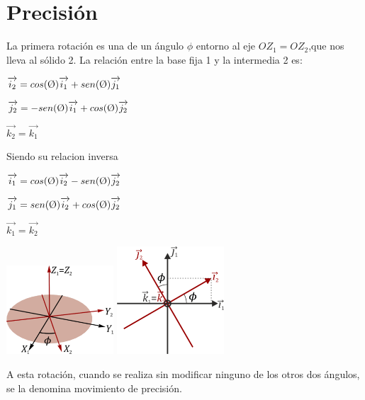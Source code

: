 \documentclass[12pt,a4paper]{report}
\begin{document}
\section{Precisión}
La primera rotación es una de un ángulo $\phi$ entorno al eje $OZ_{1}=OZ_{2}$,que nos lleva al sólido 2. La relación entre la base fija 1 y la intermedia 2 es:
\begin{center}
 $\overrightarrow{i_{2}}=cos(\textrm \O)\overrightarrow{i_{1}}+sen(\textrm \O)\overrightarrow{j_{1}}$ 
 
 $\overrightarrow{j_{2}}=-sen(\textrm \O)\overrightarrow{i_{1}}+cos(\textrm \O)\overrightarrow{j_{2}}$
 
 $\overrightarrow{k_{2}}=\overrightarrow{k_{1}}$
 \end{center} 
Siendo su relacion inversa
\begin{center}
$\overrightarrow{i_{1}}=cos(\textrm \O)\overrightarrow{i_{2}}-sen(\textrm \O)\overrightarrow{j_{2}}$

$\overrightarrow{j_{1}}=sen(\textrm \O)\overrightarrow{i_{2}}+cos(\textrm \O)\overrightarrow{j_{2}}$

$\overrightarrow{k_{1}}=\overrightarrow{k_{2}}$
\end{center}
\begin{center}
\includegraphics[width=4cm]{2.png}
\includegraphics[width=4cm]{3.png} 
\end{center} 
A esta rotación, cuando se realiza sin modificar ninguno de los otros dos ángulos, se la denomina movimiento de precisión.
\end{document}
